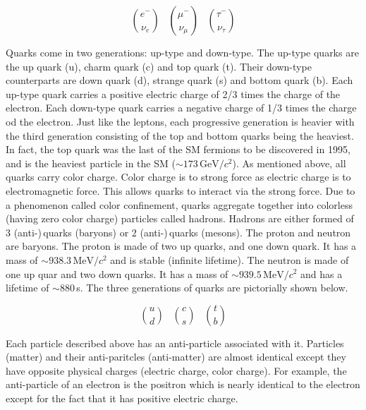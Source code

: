 \begin{equation*}                                                                                                                           \binom{e^{-}}{\nu_{e}} \;\;\; \binom{\mu^{-}}{\nu_{\mu}} \;\;\; \binom{\tau^{-}}{\nu_{\tau}}                                            \end{equation*}

Quarks come in two generations: up-type and down-type. The up-type quarks are the up quark (u), charm quark (c) and top quark (t). Their down-type counterparts are down quark (d), strange quark (s) and bottom quark (b). Each up-type quark carries a positive electric charge of 2/3 times the charge of the electron. Each down-type quark carries a negative charge of 1/3 times the charge od the electron. Just like the leptons, each progressive generation is heavier with the third generation consisting of the top and bottom quarks being the heaviest. In fact, the top quark was the last of the SM fermions to be discovered in 1995, and is the heaviest particle in the SM ($\sim 173\,\mathrm{GeV}/c^2$). As mentioned above, all quarks carry color charge. Color charge is to strong force as electric charge is to electromagnetic force. This allows quarks to interact via the strong force. Due to a phenomenon called color confinement, quarks aggregate together into colorless (having zero color charge) particles called hadrons. Hadrons are either formed of 3 (anti-)\,quarks (baryons) or 2 (anti-)\,quarks (mesons). The proton and neutron are baryons. The proton is made of two up quarks, and one down quark. It has a mass of $\sim 938.3\,\mathrm{MeV}/c^2$ and is stable (infinite lifetime). The neutron is made of one up quar and two down quarks. It has a mass of $\sim 939.5\,\mathrm{MeV}/c^2$ and has a lifetime of $\sim880\,$s. The three generations of quarks are pictorially shown below.

\begin{equation*}
  \binom{u}{d} \;\;\; \binom{c}{s} \;\;\; \binom{t}{b}
\end{equation*}

Each particle described above has an anti-particle associated with it. Particles (matter) and their anti-paritcles (anti-matter) are almost identical except they have opposite physical charges (electric charge, color charge). For example, the anti-particle of an electron is the positron which is nearly identical to the electron except for the fact that it has positive electric charge.

